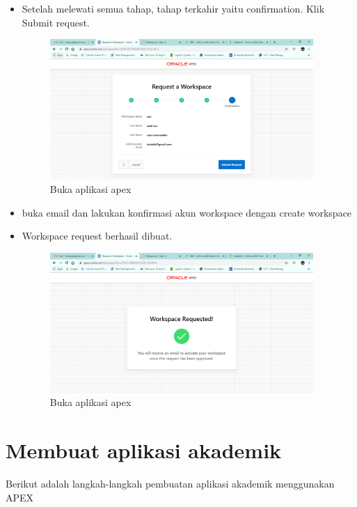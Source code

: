 \begin{itemize}
    \item Setelah melewati semua tahap, tahap terkahir yaitu confirmation. Klik Submit request.
    \begin{figure}[!htbp]
        \centering
        \includegraphics[width=10cm]{figures/work6.PNG}
        \caption{Buka aplikasi apex}
    \end{figure}
    
    \item buka email dan lakukan konfirmasi akun workspace dengan create workspace
    
    \newpage
    
    \item Workspace request berhasil dibuat.
    \begin{figure}[!htbp]
        \centering
        \includegraphics[width=10cm]{figures/workberhasil.PNG}
        \caption{Buka aplikasi apex}
    \end{figure}
\end{itemize}

\section{Membuat aplikasi akademik}
Berikut adalah langkah-langkah pembuatan aplikasi akademik menggunakan APEX

